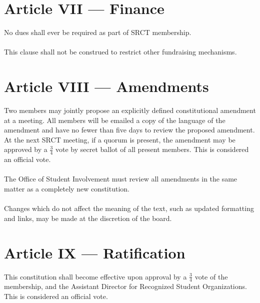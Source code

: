 \documentclass{article}
\begin{document}
  \section{Article VII --- Finance}
  No dues shall ever be required as part of SRCT membership.
  \\ \\
  This clause shall not be construed to restrict other fundraising 
  mechanisms.
  
  \section{Article VIII --- Amendments}
  Two members may jointly propose an explicitly defined 
  constitutional amendment at a meeting. All members will be emailed a 
  copy of the language of the amendment and have no fewer than five days 
  to review the proposed amendment. At the next SRCT meeting, if a 
  quorum is present, the amendment may be approved by a $\frac{3}{4}$ 
  vote by secret ballot of all present members. This is considered an 
  official vote.
  \\ \\
  The Office of Student Involvement must review all amendments in the 
  same matter as a completely new constitution.
  \\ \\
  Changes which do not affect the meaning of the text, such as updated 
  formatting and links, may be made at the discretion of the board.
  
  \section{Article IX --- Ratification}
  This constitution shall become effective upon approval by a 
  $\frac{3}{4}$ vote of the membership, and the Assistant Director for 
  Recognized Student Organizations. This is considered an official vote.
  
\end{document}
